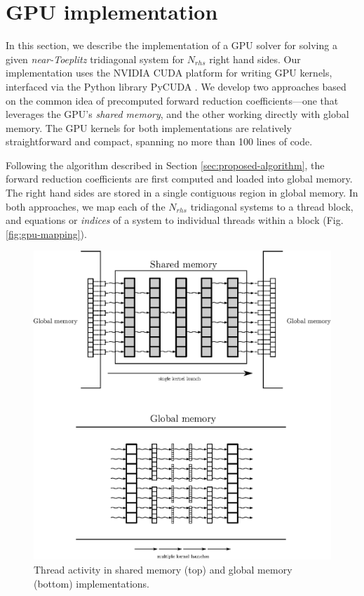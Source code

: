 \documentclass{elsarticle}
\begin{document}
\section{GPU implementation} \label{sec:gpu-implementation}

In this section, we describe the implementation of a GPU solver
for solving a given \emph{near-Toeplitz} tridiagonal system
for $N_{rhs}$ right hand sides.
Our implementation uses the NVIDIA CUDA platform for writing GPU kernels,
interfaced via the Python library PyCUDA \cite{kloeckner_pycuda_2012}.
We develop two approaches based on the common idea
of precomputed forward reduction coefficients---one that leverages
the GPU's \emph{shared memory},
and the other working directly with global memory.
The GPU kernels for both implementations are relatively
straightforward and compact,
spanning no more than 100 lines of code.

Following the algorithm described in Section \ref{sec:proposed-algorithm},
the forward reduction coefficients
are first computed and loaded into global memory.
The right hand sides are stored in a single
contiguous region in global memory.
In both approaches,
we map each of the $N_{rhs}$ tridiagonal systems
to a thread block,
and equations or \emph{indices} of a system
to individual threads within a block
(Fig. \ref{fig:gpu-mapping}).

\begin{figure}
\begin{center}
\includegraphics[width=400pt]{img/global-and-shared.eps}
\end{center}
\caption{Thread activity in shared memory (top) and global memory (bottom) implementations.}
\label{fig:global-and-shared}
\end{figure}
\end{document}
